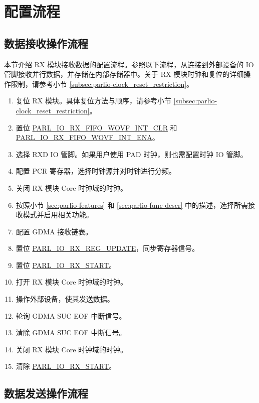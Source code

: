 \documentclass[main\_\_CN.tex]{subfiles}
\begin{document}
\section{配置流程}
\label{sec:parlio-prog-procedures}

\subsection{数据接收操作流程}

本节介绍 RX 模块接收数据的配置流程。参照以下流程，从连接到外部设备的 IO 管脚接收并行数据，并存储在内部存储器中。关于 RX 模块时钟和复位的详细操作限制，请参考小节 \ref{subsec:parlio-clock_reset_restriction}。

\begin{enumerate}
    \item 复位 RX 模块。具体复位方法与顺序，请参考小节 \ref{subsec:parlio-clock_reset_restriction}。
    \item 置位 \hyperref[fielddesc:PARLIORXFIFOWOVFINTCLR]{PARL\_IO\_RX\_FIFO\_WOVF\_INT\_CLR} 和 \hyperref[fielddesc:PARLIORXFIFOWOVFINTENA]{PARL\_IO\_RX\_FIFO\_WOVF\_INT\_ENA}。
    \item 选择 RXD IO 管脚。如果用户使用 PAD 时钟，则也需配置时钟 IO 管脚。
    \item 配置 PCR 寄存器，选择时钟源并对时钟进行分频。
    \item 关闭 RX 模块 Core 时钟域的时钟。
    \item 按照小节 \ref{sec:parlio-features} 和 \ref{sec:parlio-func-descr} 中的描述，选择所需接收模式并启用相关功能。
    \item 配置 GDMA 接收链表。
    \item 置位 \hyperref[fielddesc:PARLIORXREGUPDATE]{PARL\_IO\_RX\_REG\_UPDATE}，同步寄存器信号。
    \item 置位 \hyperref[fielddesc:PARLIORXSTART]{PARL\_IO\_RX\_START}。
    \item 打开 RX 模块 Core 时钟域的时钟。
    \item 操作外部设备，使其发送数据。
    \item 轮询 GDMA SUC EOF 中断信号。
    \item 清除 GDMA SUC EOF 中断信号。
    \item 关闭 RX 模块 Core 时钟域的时钟。
    \item 清除 \hyperref[fielddesc:PARLIORXSTART]{PARL\_IO\_RX\_START}。
\end{enumerate}

\subsection{数据发送操作流程}
\end{document}
